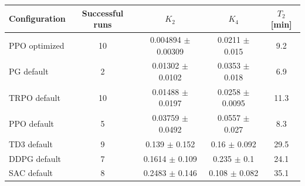 \begin{tabular}{lcccc}
\toprule
Configuration & Successful runs & $K_2$ & $K_4$ & $T_2$ [min] \\
\midrule
PPO optimized & 10 & 0.004894 $\pm$ 0.00309 & 0.0211 $\pm$ 0.015 & 9.2 \\
PG default & 2 & 0.01302 $\pm$ 0.0102 & 0.0353 $\pm$ 0.018 & 6.9 \\
TRPO default & 10 & 0.01488 $\pm$ 0.0197 & 0.0258 $\pm$ 0.0095 & 11.3 \\
PPO default & 5 & 0.03759 $\pm$ 0.0492 & 0.0557 $\pm$ 0.027 & 8.3 \\
TD3 default & 9 & 0.139 $\pm$ 0.152 & 0.16 $\pm$ 0.092 & 29.5 \\
DDPG default & 7 & 0.1614 $\pm$ 0.109 & 0.235 $\pm$ 0.1 & 24.1 \\
SAC default & 8 & 0.2483 $\pm$ 0.146 & 0.108 $\pm$ 0.082 & 35.1 \\
\bottomrule
\end{tabular}
